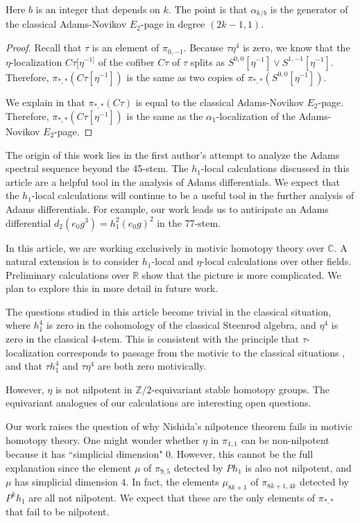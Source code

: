 \documentclass[10pt]{amsart}
\begin{document}
Here $b$ is an integer that depends on $k$.  
The point is that $\alpha_{k/b}$ is the generator of the classical Adams-Novikov
$E_2$-page in degree $(2k-1,1)$.

\begin{proof}
Recall that $\tau$ is an element of $\pi_{0,-1}$.
Because $\tau \eta^4$ is zero, we know that the
$\eta$-localization $C\tau[\eta^{-1]}$ of the cofiber $C\tau$ of $\tau$
splits as $S^{0,0}[\eta^{-1}] \vee S^{1,-1}[\eta^{-1}]$.
Therefore,
$\pi_{*,*}(C\tau[\eta^{-1}])$ is the same as two copies of 
$\pi_{*,*}(S^{0,0}[\eta^{-1}])$.

We explain in \cite{Istems} that $\pi_{*,*} (C\tau)$
is equal to the classical Adams-Novikov $E_2$-page.
Therefore, $\pi_{*,*} (C\tau[\eta^{-1}])$
is the same as the $\alpha_1$-localization of the 
Adams-Novikov $E_2$-page.
\end{proof}

The origin of this work lies in the first author's attempt to analyze the
Adams spectral sequence beyond the 45-stem.  The $h_1$-local calculations 
discussed in this article are a helpful tool in the analysis of Adams differentials.
We expect that the $h_1$-local calculations
will continue to be a useful tool in the further analysis of Adams differentials.
For example,
our work leads us to 
anticipate an Adams differential $d_2(e_0g^3) = h_1^2(e_0g)^2$ in the 77-stem.

In this article, we are working exclusively in motivic homotopy theory
over ${\ensuremath{\mathbb{C}}}$.  A natural extension is to consider $h_1$-local and $\eta$-local
calculations over other fields.  Preliminary calculations over ${\ensuremath{\mathbb{R}}}$ show that the
picture is more complicated.  We plan to explore this in more detail
in future work.

The questions studied in this article become trivial in the classical situation,
where $h_1^4$ is zero in the cohomology of the classical Steenrod algebra,
and $\eta^4$ is zero in the classical 4-stem.  
This is consistent with the principle
that 
$\tau$-localization corresponds to 
passage from the motivic to the classical situations \cite{Istems},
and that $\tau h_1^4$ and $\tau \eta^4$ are both zero motivically.

However,
$\eta$ is not nilpotent in ${\ensuremath{\mathbb{Z}}}/2$-equivariant stable homotopy groups.
The equivariant analogues of our calculations are interesting open questions.

Our work raises the question of why Nishida's nilpotence theorem
\cite{Nishida} fails in motivic homotopy theory.
One might wonder whether $\eta$ in $\pi_{1,1}$ 
can be non-nilpotent because it has ``simplicial dimension" $0$.
However, this cannot be the full explanation since
the element $\mu$ of $\pi_{9,5}$ detected by 
$P h_1$ is also not nilpotent, and $\mu$ has simplicial dimension $4$.
In fact, the elements $\mu_{8k+1}$ of $\pi_{8k+1,4k}$ detected by $P^k h_1$
are all not nilpotent.  We expect that these are the only elements
of $\pi_{*,*}$ that fail to be nilpotent.
\end{document}

